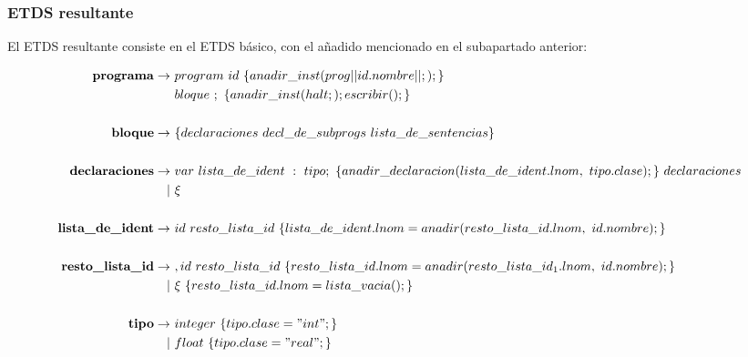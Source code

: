 \documentclass[12pt,a4paper,landscape]{article}
\theoremstyle{mytheor}
\begin{document}
\subsubsection{ETDS resultante}
El ETDS resultante consiste en el ETDS básico, con el añadido mencionado en el subapartado anterior:

\begin{center}
  \begin{align*}
    \text{\textbf{programa}} \to\ & program\ id\ \{ anadir\_inst( prog|| id.nombre || ;); \}\\
    & bloque\  ;\  \{ anadir\_inst(halt; ); escribir();\}\\\\
    \text{\textbf{ bloque}} \to\ &\{ declaraciones\ decl\_de\_subprogs\ lista\_de\_sentencias \}\\\\
    \text{\textbf{declaraciones}} \to\ & var\ lista\_de\_ident\ :\ tipo;\ \{ anadir\_declaracion(lista\_de\_ident.lnom,\ tipo.clase);\}\ declaraciones\\
    |\ &\xi\\\\
    \text{\textbf{lista\_de\_ident}} \to\ & id\ resto\_lista\_id\ \{lista\_de\_ident.lnom=anadir(resto\_lista\_id.lnom,\ id.nombre);\}\\\\
    \text{\textbf{ resto\_lista\_id}} \to\ & ,id\ resto\_lista\_id\  \{resto\_lista\_id.lnom=anadir(resto\_lista\_id_1.lnom,\ id.nombre);\} \\
    |\ &\xi\ \{resto\_lista\_id.lnom=lista\_vacia();\}\\\\
     \text{\textbf{tipo}} \to\ & integer\ \{tipo.clase="int"; \}\\
    |\ & float\ \{tipo.clase="real"; \}\\\\
  \end{align*}
\end{center}
\end{document}
